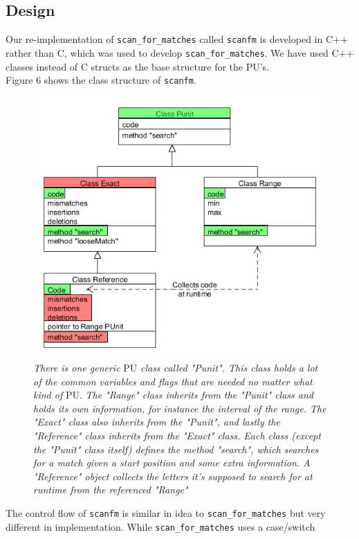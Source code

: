\documentclass[12pt]{article}
\newcommand{\scm}{\texttt{scan\_for\_matches} }
\newcommand{\sfm}{\texttt{scanfm} }
\newcommand{\pu}{PU }
\newcommand{\pup}{PU. }
\begin{document}
\subsection{Design}
Our re-implementation of \scm called \sfm is developed in C++ rather than C, which was used to develop 
\texttt{scan\_for\_matches}. We have used C++ classes instead of C structs as the base structure for the PU's. \\
Figure 6 shows the class structure of \texttt{scanfm}. 
\begin{figure}[H]
\begin{center}
\includegraphics[scale=0.7]{classdia.png}
\end{center}
\caption{\textit{There is one generic} \pu \textit{class called "Punit". This class holds a lot of the common variables
and flags that are needed no matter what kind of} \pup
\textit{The "Range" class inherits from the "Punit" class and holds its own information, 
for instance the interval of the range. 
The "Exact" class also inherits from the "Punit", and lastly the "Reference" class inherits from the "Exact" class.
Each class (except the "Punit" class itself) defines the method "search", which searches for a match given a start position
and some extra information. A "Reference" object collects the letters it's supposed to search for at runtime from
the referenced "Range"}}
\end{figure}
\noindent The control flow of \sfm is similar in idea to \scm but very different in implementation. While \scm uses a case/switch
\end{document}
